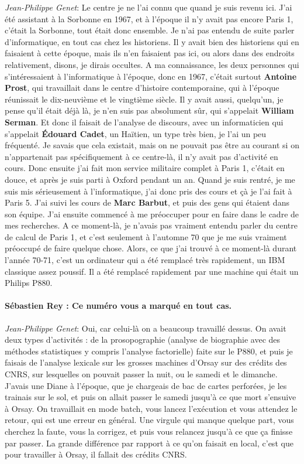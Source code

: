 \noindent\emph{Jean-Philippe Genet}: Le centre je ne l'ai connu que quand je suis revenu ici. J'ai été assistant à la Sorbonne en 1967, et à l'époque il n'y avait pas encore Paris 1, c'était la Sorbonne, tout était donc ensemble. Je n'ai pas entendu de suite parler d'informatique, en tout cas chez les historiens. Il y avait bien des historiens qui en faisaient à cette époque, mais ils n'en faisaient pas ici, ou alors dans des endroits relativement, disons, je dirais occultes. A ma connaissance, les deux personnes qui s'intéressaient à l'informatique à l'époque, donc en 1967, c'était surtout \textbf{Antoine Prost}, qui travaillait dans le centre d'histoire contemporaine, qui à l'époque réunissait le dix-neuvième et le vingtième siècle. Il y avait aussi, quelqu'un, je pense qu'il était déjà là, je n'en suis pas absolument sûr, qui s'appelait \textbf{William Serman}. Et donc il faisait de l'analyse de discours, avec un informaticien qui s'appelait \textbf{Édouard Cadet}, un Haïtien, un type très bien, je l'ai un peu fréquenté. Je savais que cela existait, mais on ne pouvait pas être au courant si on n’appartenait pas spécifiquement à ce centre-là, il n'y avait pas d'activité en cours.
Donc ensuite j'ai fait mon service militaire complet à Paris 1, c'était en douce, et après je suis parti à Oxford pendant un an. Quand je suis rentré, je me suis mis sérieusement à l'informatique, j'ai donc pris des cours et çà je l'ai fait à Paris 5. J'ai suivi les cours de \textbf{Marc Barbut}, et puis des gens qui étaient dans son équipe. J'ai ensuite commencé à me préoccuper pour en faire  dans le cadre de mes recherches. A ce moment-là, je n'avais pas vraiment entendu parler du centre de calcul de Paris 1, et c'est seulement à l'automne 70 que je me suis vraiment préoccupé de faire quelque chose. Alors, ce que j'ai trouvé à ce moment-là durant l'année 70-71, c'est un ordinateur qui a été remplacé très rapidement, un IBM classique assez poussif. Il a été remplacé rapidement par une machine qui était un  Philips P880.

\paragraph*{Sébastien Rey : Ce numéro vous a marqué en tout cas.}

\noindent\emph{Jean-Philippe Genet}: Oui, car celui-là on a beaucoup travaillé dessus. On avait deux types d'activités : de la prosopographie (analyse de biographie avec des méthodes statistiques y compris l'analyse factorielle) faite sur le P880, et puis je faisais de l'analyse lexicale sur les grosses machines d'Orsay sur des crédits des CNRS, sur lesquelles on pouvait passer la nuit, ou le samedi et le dimanche. J'avais une Diane à l'époque, que je chargeais de bac de cartes perforées, je les trainais sur le sol, et puis on allait passer le samedi jusqu'à ce que mort s'ensuive à Orsay. On travaillait en mode batch, vous lancez l'exécution et vous attendez le retour, qui est une erreur en général. Une virgule qui manque quelque part, vous cherchez la faute, vous la corrigez, et puis vous relancez jusqu'à ce que ça finisse par passer. La grande différence par rapport à ce qu'on faisait en local, c'est que pour travailler à Orsay, il fallait des crédits CNRS.


